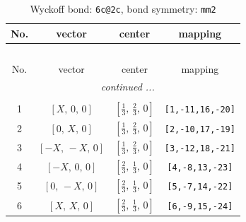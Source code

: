 \documentclass[fleqn,8pt]{jsarticle}
\begin{document}
\renewcommand{\arraystretch}{1.2}
\begin{longtable}{cccc}
\caption{Wyckoff bond: {\tt 6c@2c}, bond symmetry: {\tt mm2}}
 \\
 \hline \hline
No. & vector & center & mapping \\ \hline \endfirsthead

\multicolumn{3}{l}{\tablename\ \thetable{}} \\
 \hline \hline
No. & vector & center & mapping \\ \hline \endhead

 \hline \hline
\multicolumn{3}{r}{\footnotesize\it continued ...} \\ \endfoot

 \hline \hline
\multicolumn{3}{r}{} \\ \endlastfoot

1 & $\left[ X,\, 0,\, 0 \right]$ & $\left[ \frac{1}{3},\, \frac{2}{3},\, 0 \right]$ & {\tt [1,-11,16,-20]} \\ \hline
2 & $\left[ 0,\, X,\, 0 \right]$ & $\left[ \frac{1}{3},\, \frac{2}{3},\, 0 \right]$ & {\tt [2,-10,17,-19]} \\ \hline
3 & $\left[ - X,\, - X,\, 0 \right]$ & $\left[ \frac{1}{3},\, \frac{2}{3},\, 0 \right]$ & {\tt [3,-12,18,-21]} \\ \hline
4 & $\left[ - X,\, 0,\, 0 \right]$ & $\left[ \frac{2}{3},\, \frac{1}{3},\, 0 \right]$ & {\tt [4,-8,13,-23]} \\ \hline
5 & $\left[ 0,\, - X,\, 0 \right]$ & $\left[ \frac{2}{3},\, \frac{1}{3},\, 0 \right]$ & {\tt [5,-7,14,-22]} \\ \hline
6 & $\left[ X,\, X,\, 0 \right]$ & $\left[ \frac{2}{3},\, \frac{1}{3},\, 0 \right]$ & {\tt [6,-9,15,-24]} \\
\end{longtable}
\renewcommand{\arraystretch}{1.2}
\end{document}
